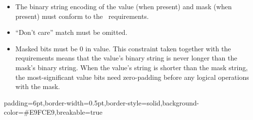 \documentclass[11pt]{article}
\begin{document}
{\begin{itemize}[noitemsep,topsep=\mdcompacttopsep]
\begin{itemize}[noitemsep,topsep=\mdcompacttopsep]%

\item{}The binary string encoding of the value (when present) and mask (when
present) must conform to the~ requirements.%

\item{}\textquotedblleft{}Don't care\textquotedblright{} match must be omitted.%

\item{}Masked bits must be 0 in value.  This constraint taken together
with the~ requirements means that the
value's binary string is never longer than the mask's binary string.
When the value's string is shorter than the mask string, the
most-significant value bits need zero-padding before any logical
operations with the mask.%
\end{itemize}%
\end{itemize}%

\begin{mdbmargintb}{6pt}{6pt}%
\begin{mdblock}{padding=6pt,border-width=0.5pt,border-style=solid,background-color=\#E9FCE9,breakable=true}%
\begin{mdpre}%
\end{mdpre}%
\end{mdblock}%
\end{mdbmargintb}%

}
\end{document}
